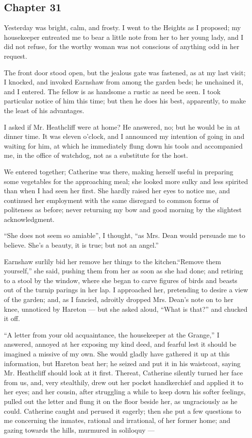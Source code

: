 \subsection*{Chapter 31}

\par Yesterday was bright, calm, and frosty. I went to the Heights as I proposed; my housekeeper entreated me to bear a little note from her to her young lady, and I did not refuse, for the worthy woman was not conscious of anything odd in her request.
\par The front door stood open, but the jealous gate was fastened, as at my last visit; I knocked, and invoked Earnshaw from among the garden beds; he unchained it, and I entered. The fellow is as handsome a rustic as need be seen. I took particular notice of him this time; but then he does his best, apparently, to make the least of his advantages.
\par I asked if Mr. Heathcliff were at home? He answered, no; but he would be in at dinner time. It was eleven o'clock, and I announced my intention of going in and waiting for him, at which he immediately flung down his tools and accompanied me, in the office of watchdog, not as a substitute for the host.
\par We entered together; Catherine was there, making herself useful in preparing some vegetables for the approaching meal; she looked more sulky and less spirited than when I had seen her first. She hardly raised her eyes to notice me, and continued her employment with the same disregard to common forms of politeness as before; never returning my bow and good morning by the slightest acknowledgment.
\par “She does not seem so amiable”, I thought, “as Mrs. Dean would persuade me to believe. She's a beauty, it is true; but not an angel.”
\par Earnshaw surlily bid her remove her things to the kitchen.“Remove them yourself,” she said, pushing them from her as soon as she had done; and retiring to a stool by the window, where she began to carve figures of birds and beasts out of the turnip parings in her lap. I approached her, pretending to desire a view of the garden; and, as I fancied, adroitly dropped Mrs. Dean's note on to her knee, unnoticed by Hareton — but she asked aloud, “What is that?” and chucked it off.
\par “A letter from your old acquaintance, the housekeeper at the Grange,” I answered, annoyed at her exposing my kind deed, and fearful lest it should be imagined a missive of my own. She would gladly have gathered it up at this information, but Hareton beat her; he seized and put it in his waistcoat, saying Mr. Heathcliff should look at it first. Thereat, Catherine silently turned her face from us, and, very stealthily, drew out her pocket handkerchief and applied it to her eyes; and her cousin, after struggling a while to keep down his softer feelings, pulled out the letter and flung it on the floor beside her, as ungraciously as he could. Catherine caught and perused it eagerly; then she put a few questions to me concerning the inmates, rational and irrational, of her former home; and gazing towards the hills, murmured in soliloquy —
